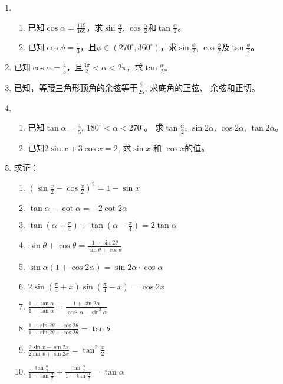 \begin{enumerate}
\item \begin{enumerate}
    \item 已知$\cos\alpha =\frac{119}{169}$，求$\sin\frac{\alpha}{2}$, $\cos\frac{\alpha}{2}$和$\tan\frac{\alpha}{2}$。
    \item 已知$\cos\phi=\frac{1}{3}$，且$\phi\in(270^{\circ}, 360^{\circ})$，求$\sin\frac{\phi}{2}$, $\cos\frac{\phi}{2}$及$\tan\frac{\phi}{2}$。
\end{enumerate}
\item 已知$\cos\alpha=\frac{4}{5}$，且$\frac{3\pi}{2}<\alpha<2\pi$，求$\tan\frac{\alpha}{2}$。
\item 已知，等腰三角形顶角的余弦等于$\frac{7}{25}$, 求底角的正弦、
余弦和正切。
\item \begin{enumerate}
    \item 已知$\tan\alpha=\frac{4}{5}$, $180^{\circ}<\alpha<270^{\circ}$。
求$\tan\frac{\alpha}{2}$, $\sin2\alpha$, $\cos2\alpha$, $\tan 2\alpha$。
\item 已知$2\sin x+3\cos x=2$, 
求$\sin x$ 和 $\cos x$的值。
\end{enumerate}

\item 求证：
\begin{enumerate}
    \item $\left(\sin\frac{x}{2}-\cos\frac{x}{2}\right)^2=1-\sin x$
    \item $\tan\alpha-\cot\alpha=-2\cot 2\alpha$
    \item $\tan\left(\alpha+\frac{\pi}{4}\right)+\tan\left(\alpha-\frac{\pi}{4}\right)=2\tan\alpha$
    \item $\sin\theta+\cos\theta=\frac{1+\sin2\theta}{\sin\theta+\cos\theta}$
    \item $\sin\alpha(1+\cos2\alpha)=\sin2\alpha\cdot \cos\alpha$
    \item $2\sin\left(\frac{\pi}{4}+x\right)\sin\left(\frac{\pi}{4}-x\right)=\cos2x$
    \item $\frac{1+\tan\alpha}{1-\tan\alpha}=\frac{1+\sin2\alpha}{\cos^2\alpha-\sin^2\alpha}$
    \item $\frac{1+\sin2\theta-\cos2\theta}{1+\sin2\theta+\cos2\theta}=\tan\theta$
    \item $\frac{2\sin x-\sin2x}{2\sin x+\sin2x}=\tan^2\frac{x}{2}$
    \item $\frac{\tan\frac{\alpha}{2}}{1+\tan\frac{\alpha}{2}}+\frac{\tan\frac{\alpha}{2}}{1-\tan\frac{\alpha}{2}}=\tan\alpha$
\end{enumerate}


\end{enumerate}
